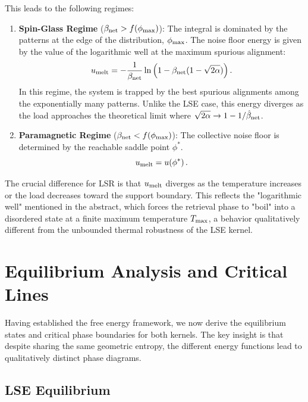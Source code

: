 \documentclass{article}
\theoremstyle{plain}
\theoremstyle{definition}
\theoremstyle{remark}
\begin{document}
This leads to the following regimes:
\begin{enumerate}
    \item \textbf{Spin-Glass Regime} ($\beta_{\rm net} > f(\phi_{\rm max})$): 
    The integral is dominated by the patterns at the edge of the distribution, $\phi_{\rm max}$. The noise floor energy is given by the value of the logarithmic well at the maximum spurious alignment:
    \begin{equation}
        u_{\rm melt} = -\frac{1}{\beta_{\rm net}} \ln \left( 1 - \beta_{\rm net} (1 - \sqrt{2\alpha}) \right).
    \end{equation}
    In this regime, the system is trapped by the best spurious alignments among the exponentially many patterns. Unlike the LSE case, this energy diverges as the load approaches the theoretical limit where $\sqrt{2\alpha} \to 1 - 1/\hat\beta_{\rm net}$.
    
    \item \textbf{Paramagnetic Regime} ($\beta_{\rm net} < f(\phi_{\rm max})$): 
    The collective noise floor is determined by the reachable saddle point $\phi^*$. 
    \begin{equation}
        u_{\rm melt} = u(\phi^*)\,.
    \end{equation}
    
\end{enumerate}


The crucial difference for LSR is that $u_{\rm melt}$ diverges as the temperature increases or the load decreases toward the support boundary. This reflects the "logarithmic well" mentioned in the abstract, which forces the retrieval phase to "boil" into a disordered state at a finite maximum temperature $T_{\rm max}$, a behavior qualitatively different from the unbounded thermal robustness of the LSE kernel.



\section{Equilibrium Analysis and Critical Lines}

Having established the free energy framework, we now derive the equilibrium states and critical phase boundaries for both kernels. The key insight is that despite sharing the same geometric entropy, the different energy functions lead to qualitatively distinct phase diagrams.

\subsection{LSE Equilibrium}
\end{document}
